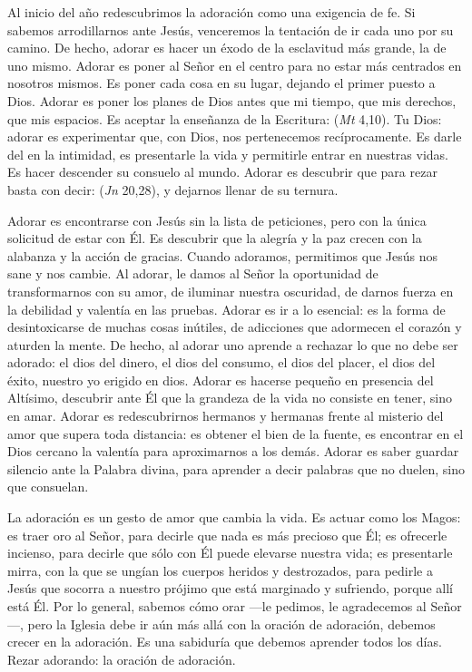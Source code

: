 Al inicio del año redescubrimos la adoración como una exigencia de fe. Si sabemos arrodillarnos ante Jesús, venceremos la tentación de ir cada uno por su camino. De hecho, adorar es hacer un éxodo de la esclavitud más grande, la de uno mismo. Adorar es poner al Señor en el centro para no estar más centrados en nosotros mismos. Es poner cada cosa en su lugar, dejando el primer puesto a Dios. Adorar es poner los planes de Dios antes que mi tiempo, que mis derechos, que mis espacios. Es aceptar la enseñanza de la Escritura:  (\emph{Mt} 4,10). Tu Dios: adorar es experimentar que, con Dios, nos pertenecemos recíprocamente. Es darle del  en la intimidad, es presentarle la vida y permitirle entrar en nuestras vidas. Es hacer descender su consuelo al mundo. Adorar es descubrir que para rezar basta con decir:  (\emph{Jn} 20,28), y dejarnos llenar de su ternura.

Adorar es encontrarse con Jesús sin la lista de peticiones, pero con la única solicitud de estar con Él. Es descubrir que la alegría y la paz crecen con la alabanza y la acción de gracias. Cuando adoramos, permitimos que Jesús nos sane y nos cambie. Al adorar, le damos al Señor la oportunidad de transformarnos con su amor, de iluminar nuestra oscuridad, de darnos fuerza en la debilidad y valentía en las pruebas. Adorar es ir a lo esencial: es la forma de desintoxicarse de muchas cosas inútiles, de adicciones que adormecen el corazón y aturden la mente. De hecho, al adorar uno aprende a rechazar lo que no debe ser adorado: el dios del dinero, el dios del consumo, el dios del placer, el dios del éxito, nuestro yo erigido en dios. Adorar es hacerse pequeño en presencia del Altísimo, descubrir ante Él que la grandeza de la vida no consiste en tener, sino en amar. Adorar es redescubrirnos hermanos y hermanas frente al misterio del amor que supera toda distancia: es obtener el bien de la fuente, es encontrar en el Dios cercano la valentía para aproximarnos a los demás. Adorar es saber guardar silencio ante la Palabra divina, para aprender a decir palabras que no duelen, sino que consuelan.

La adoración es un gesto de amor que cambia la vida. Es actuar como los Magos: es traer oro al Señor, para decirle que nada es más precioso que Él; es ofrecerle incienso, para decirle que sólo con Él puede elevarse nuestra vida; es presentarle mirra, con la que se ungían los cuerpos heridos y destrozados, para pedirle a Jesús que socorra a nuestro prójimo que está marginado y sufriendo, porque allí está Él. Por lo general, sabemos cómo orar ---le pedimos, le agradecemos al Señor---, pero la Iglesia debe ir aún más allá con la oración de adoración, debemos crecer en la adoración. Es una sabiduría que debemos aprender todos los días. Rezar adorando: la oración de adoración.

